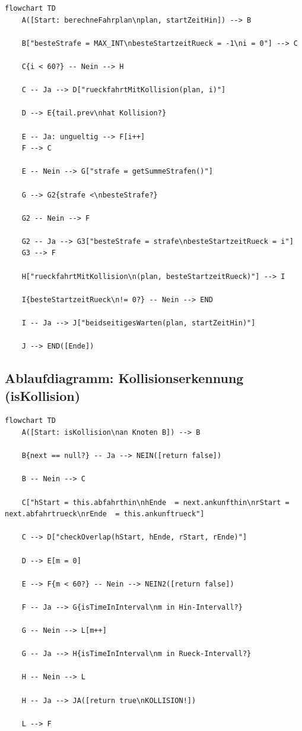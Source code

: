 \documentclass[12pt,a4paper]{article}
\begin{document}
\begin{lstlisting}[style=mermaid, caption={Flussdiagramm -- Algorithmus BeidseitigesWartenStrategie.berechneFahrplan()}]
flowchart TD
    A([Start: berechneFahrplan\nplan, startZeitHin]) --> B

    B["besteStrafe = MAX_INT\nbesteStartzeitRueck = -1\ni = 0"] --> C

    C{i < 60?} -- Nein --> H

    C -- Ja --> D["rueckfahrtMitKollision(plan, i)"]

    D --> E{tail.prev\nhat Kollision?}

    E -- Ja: ungueltig --> F[i++]
    F --> C

    E -- Nein --> G["strafe = getSummeStrafen()"]

    G --> G2{strafe <\nbesteStrafe?}

    G2 -- Nein --> F

    G2 -- Ja --> G3["besteStrafe = strafe\nbesteStartzeitRueck = i"]
    G3 --> F

    H["rueckfahrtMitKollision\n(plan, besteStartzeitRueck)"] --> I

    I{besteStartzeitRueck\n!= 0?} -- Nein --> END

    I -- Ja --> J["beidseitigesWarten(plan, startZeitHin)"]

    J --> END([Ende])
\end{lstlisting}

\subsection{Ablaufdiagramm: Kollisionserkennung (isKollision)}

\begin{lstlisting}[style=mermaid, caption={Flussdiagramm -- BahnhofNode.isKollision()}]
flowchart TD
    A([Start: isKollision\nan Knoten B]) --> B

    B{next == null?} -- Ja --> NEIN([return false])

    B -- Nein --> C

    C["hStart = this.abfahrthin\nhEnde  = next.ankunfthin\nrStart = next.abfahrtrueck\nrEnde  = this.ankunftrueck"]

    C --> D["checkOverlap(hStart, hEnde, rStart, rEnde)"]

    D --> E[m = 0]

    E --> F{m < 60?} -- Nein --> NEIN2([return false])

    F -- Ja --> G{isTimeInInterval\nm in Hin-Intervall?}

    G -- Nein --> L[m++]

    G -- Ja --> H{isTimeInInterval\nm in Rueck-Intervall?}

    H -- Nein --> L

    H -- Ja --> JA([return true\nKOLLISION!])

    L --> F
\end{lstlisting}
\end{document}
